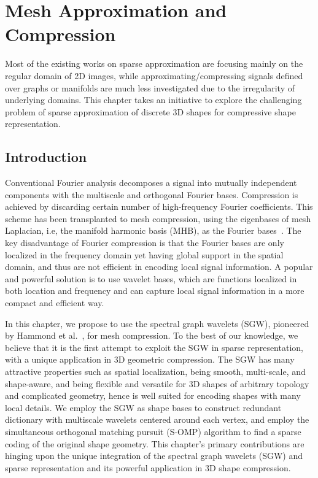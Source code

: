 \chapter{Mesh Approximation and Compression}

Most of the existing works on sparse approximation are focusing mainly
on the regular domain of 2D images, while approximating/compressing
signals defined over graphs or manifolds are much less investigated
due to the irregularity of underlying domains. This chapter takes an
initiative to explore the challenging problem of sparse approximation
of discrete 3D shapes for compressive shape representation.

\section{Introduction}
Conventional Fourier analysis decomposes a signal into mutually
independent components with the multiscale and orthogonal Fourier
bases. Compression is achieved by discarding certain number of
high-frequency Fourier coefficients. This scheme has been transplanted
to mesh compression, using the eigenbases of mesh Laplacian, i.e, the
manifold harmonic basis (MHB), as the Fourier
bases~\cite{Karni2000}. The key disadvantage of Fourier
compression is that the Fourier bases are only localized in the
frequency domain yet having global support in the spatial domain, and
thus are not efficient in encoding local signal information. A popular
and powerful solution is to use wavelet bases, which are functions
localized in both location and frequency and can capture local signal
information in a more compact and efficient way.

In this chapter, we propose to use the spectral graph wavelets (SGW),
pioneered by Hammond et al.~\cite{Hammond2011}, for mesh
compression. To the best of our knowledge, we believe that it is the
first attempt to exploit the SGW in sparse representation, with a
unique application in 3D geometric compression. The SGW has many
attractive properties such as spatial localization, being smooth,
multi-scale, and shape-aware, and being flexible and versatile for 3D
shapes of arbitrary topology and complicated geometry, hence is well
suited for encoding shapes with many local details. We employ the SGW
as shape bases to construct redundant dictionary with multiscale
wavelets centered around each vertex, and employ the simultaneous
orthogonal matching pursuit (S-OMP) algorithm to find a sparse coding
of the original shape geometry. This chapter's primary contributions are
hinging upon the unique integration of the spectral graph wavelets
(SGW) and sparse representation and its powerful application in 3D
shape compression.

